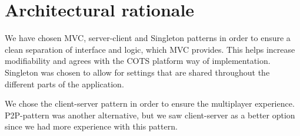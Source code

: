 \section{Architectural rationale}
\label{sec:architecturalrationale}

We have chosen MVC, server-client and Singleton patterns in order to ensure a
clean separation of interface and logic, which MVC provides. This helps
increase modifiability and agrees with the COTS platform way of implementation.
Singleton was chosen to allow for settings that are shared throughout the
different parts of the application.

We chose the client-server pattern in order to ensure the multiplayer
experience. P2P-pattern was another alternative, but we saw client-server as a
better option since we had more experience with this pattern.

